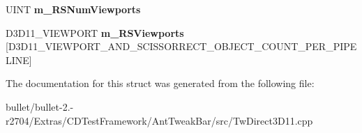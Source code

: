 \begin{DoxyCompactItemize}
\item 
\hypertarget{struct_c_state11_ade9ee729aaf0a8ac7c9768784481a08e}{U\+I\+N\+T {\bfseries m\+\_\+\+R\+S\+Num\+Viewports}}\label{struct_c_state11_ade9ee729aaf0a8ac7c9768784481a08e}

\item 
\hypertarget{struct_c_state11_a182c8d9513e371b578371a82afa5553e}{D3\+D11\+\_\+\+V\+I\+E\+W\+P\+O\+R\+T {\bfseries m\+\_\+\+R\+S\+Viewports} \mbox{[}D3\+D11\+\_\+\+V\+I\+E\+W\+P\+O\+R\+T\+\_\+\+A\+N\+D\+\_\+\+S\+C\+I\+S\+S\+O\+R\+R\+E\+C\+T\+\_\+\+O\+B\+J\+E\+C\+T\+\_\+\+C\+O\+U\+N\+T\+\_\+\+P\+E\+R\+\_\+\+P\+I\+P\+E\+L\+I\+N\+E\mbox{]}}\label{struct_c_state11_a182c8d9513e371b578371a82afa5553e}

\end{DoxyCompactItemize}


The documentation for this struct was generated from the following file\+:\begin{DoxyCompactItemize}
\item 
bullet/bullet-\/2.-\/r2704/\+Extras/\+C\+D\+Test\+Framework/\+Ant\+Tweak\+Bar/src/Tw\+Direct3\+D11.\+cpp\end{DoxyCompactItemize}
